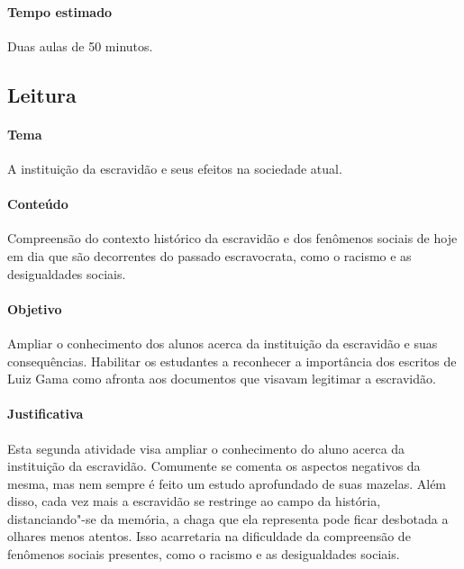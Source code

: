 \documentclass[12pt]{extarticle}
\begin{document}
\paragraph{Tempo estimado} Duas aulas de 50 minutos.

\subsection{Leitura}


\paragraph{Tema} A instituição da escravidão e seus efeitos na sociedade atual.

\paragraph{Conteúdo} Compreensão do contexto histórico
da escravidão e dos fenômenos sociais de hoje em dia que são decorrentes
do passado escravocrata, como o racismo e as desigualdades sociais.

\paragraph{Objetivo} Ampliar o conhecimento dos alunos acerca da instituição da 
escravidão e suas consequências. Habilitar os estudantes a reconhecer a importância 
dos escritos de Luiz Gama como afronta aos documentos que visavam legitimar a escravidão.


\paragraph{Justificativa} Esta segunda atividade visa ampliar o conhecimento do aluno
acerca da instituição da escravidão. Comumente se comenta os aspectos
negativos da mesma, mas nem sempre é feito um estudo aprofundado de suas
mazelas. Além disso, cada vez mais a escravidão se restringe ao campo da
história, distanciando"-se da memória, a chaga que ela representa pode
ficar desbotada a olhares menos atentos. Isso acarretaria na dificuldade
da compreensão de fenômenos sociais presentes, como o racismo e as
desigualdades sociais.

\end{document}
